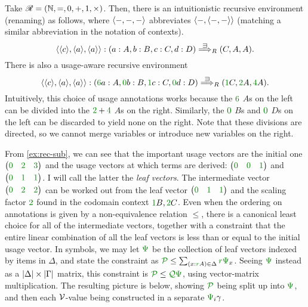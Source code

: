\begin{example}\label{ex:rec-ren}
  Take $\Ann = \plr{\mathbb N, =, 0, +, 1, \times}$.
  Then, there is an intuitionistic recursive environment (renaming) as follows,
  where $\alr{-,-,-}$ abbreviates $\alr{-,\alr{-,-}}$ (matching a similar
  abbreviation in the notation of contexts).
  \[
    \alr{\alr{c},\alr{a},\alr{a}} :
    \plr{a : A, b : B, c : C, d : D} \env\sqni_R \plr{C, A, A}.
  \]
  There is also a usage-aware recursive environment
  \[
    \alr{\alr{c},\alr{a},\alr{a}} :
    \plr{\gr6a : A, \gr0b : B, \gr1c : C, \gr0d : D}
    \env\sqni_R \plr{\gr1C, \gr2A, \gr4A}.
  \]
  Intuitively, this choice of usage annotations works because the $\gr6$ $A$s on
  the left can be divided into the $\gr2 + \gr4$ $A$s on the right.
  Similarly, the $\gr0$ $B$s and $\gr0$ $D$s on the left can be discarded to
  yield none on the right.
  Note that these divisions are directed, so we cannot merge variables or
  introduce new variables on the right.
\end{example}

From \cref{ex:rec-sub}, we can see that the important usage vectors are the
initial one $\begin{pmatrix} \gr0 & \gr2 & \gr3 \end{pmatrix}$ and the usage
vectors at which terms are derived:
$\begin{pmatrix} \gr0 & \gr0 & \gr1 \end{pmatrix}$
and $\begin{pmatrix} \gr0 & \gr1 & \gr1 \end{pmatrix}$.
I will call the latter the \emph{leaf vectors}.
The intermediate vector $\begin{pmatrix} \gr0 & \gr2 & \gr2 \end{pmatrix}$ can
be worked out from the leaf vector
$\begin{pmatrix} \gr0 & \gr1 & \gr1 \end{pmatrix}$ and the scaling factor
$\gr2$ found in the codomain context $\gr1B, \gr2C$.
Even when the ordering on annotations is given by a non-equivalence relation
$\leq$, there is a canonical least choice for all of the intermediate vectors,
together with a constraint that the entire linear combination of all the leaf
vectors is less than or equal to the initial usage vector.
In symbols, we may let $\gr\Psi$ be the collection of leaf vectors indexed by
items in $\Delta$, and state
the constraint as $\grP \leq \sum_{\plr{x : \gr rA} \in \Delta} \gr r\gr\Psi_x$.
Seeing $\gr\Psi$ instead as a $\size\Delta \times \size\Gamma$ matrix, this
constraint is $\grP \leq \grQ\gr\Psi$, using vector-matrix multiplication.
The resulting picture is below, showing $\grP$ being split up into $\gr\Psi$,
and then each $\mathcal V$-value being constructed in a separate $\gr\Psi_i\gamma$.

